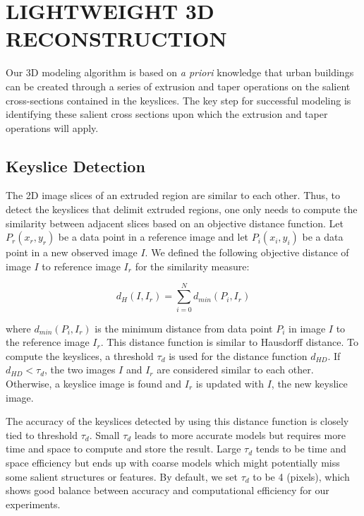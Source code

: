 \documentclass{article}
\begin{document}
\section{LIGHTWEIGHT 3D RECONSTRUCTION}
\label{sec:reconst}

Our 3D modeling algorithm is based on \emph{a priori} knowledge that
urban buildings can be created through a series of extrusion and taper
operations on the salient cross-sections contained in the keyslices.
The key step for successful modeling is identifying these salient cross
sections upon which the extrusion and taper operations will apply.

\subsection{Keyslice Detection}
\label{ssec:ksd}
The 2D image slices of an extruded region are similar to each other.
Thus, to detect the keyslices that delimit extruded regions, one only needs
to compute the similarity between adjacent slices based on an
objective distance function.
Let $P_r(x_r, y_r)$ be a data point in a reference image and
let $P_i(x_i, y_i)$ be a data point in a new observed image $I$.
We defined the following objective distance of image $I$ to reference image $I_r$
for the similarity measure:

\begin{equation}
d_H(I, I_r) = \sum_{i=0}^Nd_{min}(P_i, I_r)
\label{eq:hd}
\end{equation}

where $d_{min}(P_i, I_r)$ is the minimum distance from data point $P_i$
in image $I$ to the reference image $I_r$.
This distance function is similar to Hausdorff distance.
To compute the keyslices, a threshold $\tau_{d}$ is used for the
distance function $d_{HD}$.
If $d_{HD} < \tau_{d}$, the two images $I$ and $I_r$ are considered
similar to each other.
Otherwise, a keyslice image is found and $I_r$ is updated with $I$,
the new keyslice image.

The accuracy of the keyslices detected by using this distance function
is closely tied to threshold $\tau_d$.
Small $\tau_d$ leads to more accurate models but requires more time and
space to compute and store the result.
Large $\tau_d$ tends to be time and space efficiency but 
ends up with coarse models which might potentially
miss some salient structures or features.
By default, we set $\tau_d$ to be 4 (pixels), which shows good balance
between accuracy and computational efficiency for our experiments. 
\end{document}
